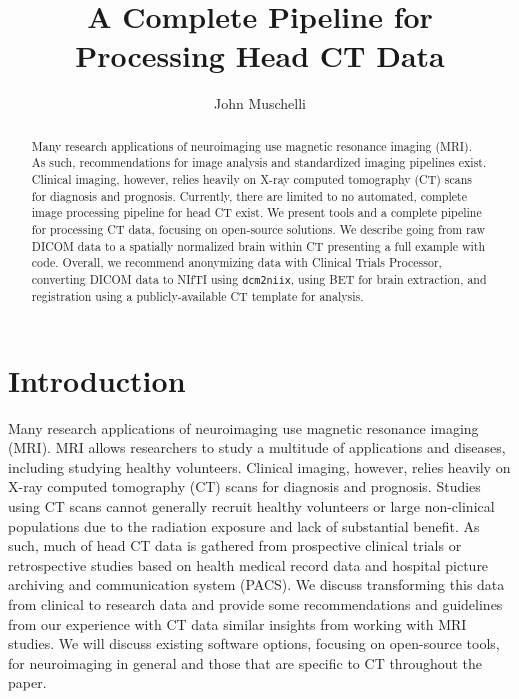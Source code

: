 \documentclass[]{elsarticle} %
\begin{document}
\begin{frontmatter}

  \title{A Complete Pipeline for Processing Head CT Data}
    \author[JHSPH]{John Muschelli}
  
      \address[JHSPH]{Johns Hopkins Bloomberg School of Public Health, Department of Biostatistics, 615 N Wolfe St, Baltimore, MD, 21205}
  
  \begin{abstract}
  Many research applications of neuroimaging use magnetic resonance imaging (MRI). As such, recommendations for image analysis and standardized imaging pipelines exist. Clinical imaging, however, relies heavily on X-ray computed tomography (CT) scans for diagnosis and prognosis. Currently, there are limited to no automated, complete image processing pipeline for head CT exist. We present tools and a complete pipeline for processing CT data, focusing on open-source solutions. We describe going from raw DICOM data to a spatially normalized brain within CT presenting a full example with code. Overall, we recommend anonymizing data with Clinical Trials Processor, converting DICOM data to NIfTI using \texttt{dcm2niix}, using BET for brain extraction, and registration using a publicly-available CT template for analysis.
  \end{abstract}
  
 \end{frontmatter}

\hypertarget{introduction}{%
\section{Introduction}\label{introduction}}

Many research applications of neuroimaging use magnetic resonance imaging (MRI). MRI allows researchers to study a multitude of applications and diseases, including studying healthy volunteers. Clinical imaging, however, relies heavily on X-ray computed tomography (CT) scans for diagnosis and prognosis. Studies using CT scans cannot generally recruit healthy volunteers or large non-clinical populations due to the radiation exposure and lack of substantial benefit. As such, much of head CT data is gathered from prospective clinical trials or retrospective studies based on health medical record data and hospital picture archiving and communication system (PACS). We discuss transforming this data from clinical to research data and provide some recommendations and guidelines from our experience with CT data similar insights from working with MRI studies. We will discuss existing software options, focusing on open-source tools, for neuroimaging in general and those that are specific to CT throughout the paper.
\end{document}
